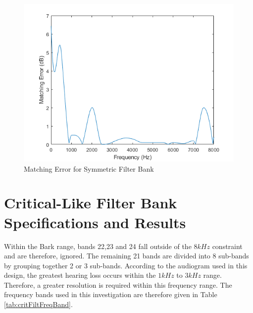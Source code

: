 \documentclass[11pt,onecolumn]{witseiepaper}
\begin{document}
\begin{appendices}
\begin{figure}[h]
\centering
\includegraphics[width=0.6\linewidth]{symMatErr.PNG}
\caption{Matching Error for Symmetric Filter Bank}
\label{fig:symMatErr}
\end{figure}  


\section{Critical-Like Filter Bank Specifications and Results}
\label{app:critFiltFreqBand}

\noindent Within the Bark range, bands 22,23 and 24 fall outside of the $8kHz$ constraint and are therefore, ignored. The remaining 21 bands are divided into 8 sub-bands by grouping together 2 or 3 sub-bands. According to the audiogram used in this design, the greatest hearing loss occurs within the $1kHz$ to $3kHz$ range. Therefore, a greater resolution is required within this frequency range. The frequency bands used in this investigation are therefore given in Table \ref{tab:critFiltFreqBand}.


\end{appendices}
\end{document}
